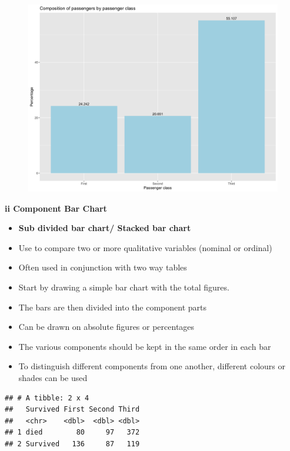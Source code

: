\documentclass[]{book}
\providecommand{\tightlist}{%
  \setlength{\itemsep}{0pt}\setlength{\parskip}{0pt}}
\begin{document}
\begin{figure}

{\centering \includegraphics[width=1\linewidth]{figure/box9-1} 

}

\end{figure}

\textbf{ii Component Bar Chart }

\begin{itemize}
\tightlist
\item
  \textbf{Sub divided bar chart/ Stacked bar chart}
\item
  Use to compare two or more qualitative variables (nominal or ordinal)
\item
  Often used in conjunction with two way tables
\item
  Start by drawing a simple bar chart with the total figures.
\item
  The bars are then divided into the component parts
\item
  Can be drawn on absolute figures or percentages
\item
  The various components should be kept in the same order in each bar
\item
  To distinguish different components from one another, different colours or shades can be used
\end{itemize}

\begin{verbatim}
## # A tibble: 2 x 4
##   Survived First Second Third
##   <chr>    <dbl>  <dbl> <dbl>
## 1 died        80     97   372
## 2 Survived   136     87   119
\end{verbatim}
\end{document}
